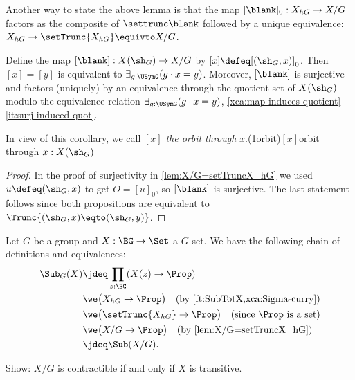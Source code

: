 Another way to state the above lemma is that the map 
$[\blank]_0 :X_{hG}\to X/G$ factors as the composite of $\settrunc\blank$
followed by a unique equivalence: $X_{hG}\to \setTrunc{X_{hG}}\equivto X/G$.

\begin{corollary}\label{cor:orbit-equiv}
Define the map $[\blank] : X(\sh_G) \to X/G$ by $[x]\defeq[(\sh_G,x)]_0$.
Then $[x] = [y]$ is equivalent to $\exists_{g:\USymG}(g\cdot x = y)$.
Moreover, $[\blank]$ is surjective and factors (uniquely) 
by an equivalence through the
quotient set of $X(\sh_G)$ modulo the equivalence relation 
$\exists_{g:\USymG}(g\cdot x = y)$, \cf
\cref{xca:map-induces-quotient}\ref{it:surj-induced-quot}. 
\end{corollary}

In view of this corollary, we call $[x]$ \emph{the orbit
through} $x$.\glossary(1orbit){$[x]$}{orbit through $x:X(\sh_G)$}
\begin{proof}
In the proof of surjectivity in \cref{lem:X/G=setTruncX_hG} we used
$u\defeq(\sh_G,x)$ to get $O=[u]_0$, so $[\blank]$ is surjective. 
The last statement follows since
both propositions are equivalent to $\Trunc{(\sh_G,x)\eqto(\sh_G,y)}$.
\end{proof}

\begin{remark}\label{rem:SubGX=Sub(X/G)}
Let $G$ be a group and $X : \BG\to\Set$ a $G$-set.
We have the following chain of definitions and equivalences:
\begin{align*}
\Sub_G(X)&\jdeq \prod_{z:\BG}(X(z)\to\Prop) 
\\
         & \we \bigl(X_{hG}\to\Prop\bigr)
               \quad\text{(by \cref{ft:SubTotX,xca:Sigma-curry})}
\\
         & \we \bigl(\setTrunc{X_{hG}}\to\Prop\bigr) 
               \quad\text{(since $\Prop$ is a set)}
\\        
         & \we \bigl(X/G\to\Prop\bigr)
               \quad\text{(by \cref{lem:X/G=setTruncX_hG})}
\\
         & \jdeq \Sub(X/G).\qedhere
\end{align*}
\end{remark}

\begin{xca}\label{xca:transX-just1orbit}
Show: $X/G$ is contractible if and only if $X$ is transitive.
\end{xca}


